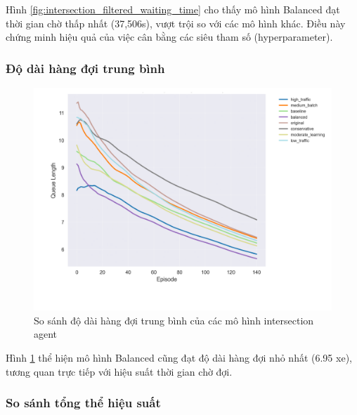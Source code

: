 Hình \ref{fig:intersection_filtered_waiting_time} cho thấy mô hình Balanced đạt thời
gian chờ thấp nhất (37,506s), vượt trội so với các mô hình khác. Điều này chứng minh
hiệu quả của việc cân bằng các siêu tham số (hyperparameter).

\subsubsection{Độ dài hàng đợi trung bình}

\begin{figure}[!htp]
    \centering
    \includegraphics[width=\textwidth]{figures/individual_plots/intersection_filtered_queue_length.png}
    \caption{So sánh độ dài hàng đợi trung bình của các mô hình intersection agent}
    \label{fig:intersection_filtered_queue_length}
\end{figure}

Hình \ref{fig:intersection_filtered_queue_length} thể hiện mô hình Balanced cũng
đạt độ dài hàng đợi nhỏ nhất (6.95 xe), tương quan trực tiếp với hiệu suất thời
gian chờ đợi.

\subsubsection{So sánh tổng thể hiệu suất}

